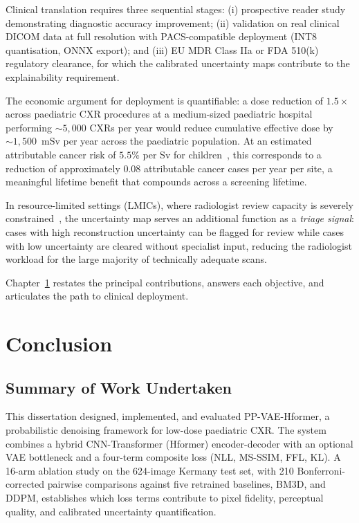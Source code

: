 \documentclass[12pt, a4paper, twoside, openright]{book}
\begin{document}
Clinical translation requires three sequential stages: (i) prospective reader study demonstrating diagnostic accuracy improvement; (ii) validation on real clinical DICOM data at full resolution with PACS-compatible deployment (INT8 quantisation, ONNX export); and (iii) EU MDR Class IIa or FDA 510(k) regulatory clearance, for which the calibrated uncertainty maps contribute to the explainability requirement.

The economic argument for deployment is quantifiable: a dose reduction of $1.5\times$ across paediatric CXR procedures at a medium-sized paediatric hospital performing $\sim5,000$ CXRs per year would reduce cumulative effective dose by $\sim1,500$~mSv per year across the paediatric population. At an estimated attributable cancer risk of $5.5\%$ per Sv for children~\cite{pearce_radiation_2012}, this corresponds to a reduction of approximately $0.08$ attributable cancer cases per year per site, a meaningful lifetime benefit that compounds across a screening lifetime.

In resource-limited settings (LMICs), where radiologist review capacity is severely constrained~\cite{world_health_organisation_classification_2020}, the uncertainty map serves an additional function as a \emph{triage signal}: cases with high reconstruction uncertainty can be flagged for review while cases with low uncertainty are cleared without specialist input, reducing the radiologist workload for the large majority of technically adequate scans.

Chapter~\ref{chap:conclusion} restates the principal contributions, answers each objective, and articulates the path to clinical deployment.

\chapter{Conclusion}
\label{chap:conclusion}

\section{Summary of Work Undertaken}
\label{sec:conc:summary}

This dissertation designed, implemented, and evaluated PP-VAE-Hformer, a probabilistic denoising framework for low-dose paediatric CXR. The system combines a hybrid CNN-Transformer (Hformer) encoder-decoder with an optional VAE bottleneck and a four-term composite loss (NLL, MS-SSIM, FFL, KL). A 16-arm ablation study on the 624-image Kermany test set, with 210 Bonferroni-corrected pairwise comparisons against five retrained baselines, BM3D, and DDPM, establishes which loss terms contribute to pixel fidelity, perceptual quality, and calibrated uncertainty quantification.
\end{document}
